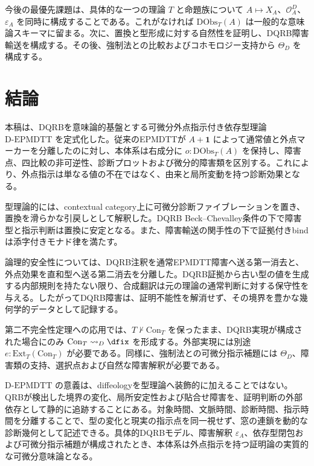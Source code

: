 \documentclass[a4paper,11pt]{ltjsarticle}
\theoremstyle{definition}
\theoremstyle{plain}
\newcommand{\DEPMDTT}{\mathrm{D}\text{-}\mathrm{EPMDTT}}
\newcommand{\DObs}{\mathrm{DObs}}
\newcommand{\Ext}{\mathrm{Ext}}
\newcommand{\Con}{\mathrm{Con}}
\newcommand{\Unit}{\mathbf 1}
\begin{document}
今後の最優先課題は、具体的な一つの理論 $T$ と命題族について $A\mapsto X_A$、$\mathcal O_A^D$、$\varepsilon_A$ を同時に構成することである。これがなければ $\DObs_T(A)$ は一般的な意味論スキーマに留まる。次に、置換と型形成に対する自然性を証明し、DQRB障害輸送を構成する。その後、強制法との比較およびコホモロジー支持から $\Theta_D$ を構成する。

\section{結論}

本稿は、DQRBを意味論的基盤とする可微分外点指示付き依存型理論 $\DEPMDTT$ を定式化した。従来のEPMDTTが $A+\Unit$ によって通常値と外点マーカーを分離したのに対し、本体系は右成分に $o:\DObs_T(A)$ を保持し、障害点、四比較の非可逆性、診断プロットおよび微分的障害類を区別する。これにより、外点指示は単なる値の不在ではなく、由来と局所変動を持つ診断効果となる。

型理論的には、contextual category上に可微分診断ファイブレーションを置き、置換を滑らかな引戻しとして解釈した。DQRB Beck--Chevalley条件の下で障害型と指示判断は置換に安定となる。また、障害輸送の関手性の下で証拠付きbindは添字付きモナド律を満たす。

論理的安全性については、DQRB注釈を通常EPMDTT障害へ送る第一消去と、外点効果を直和型へ送る第二消去を分離した。DQRB証拠から古い型の値を生成する内部規則を持たない限り、合成翻訳は元の理論の通常判断に対する保守性を与える。したがってDQRB障害は、証明不能性を解消せず、その境界を豊かな幾何学的データとして記録する。

第二不完全性定理への応用では、$T\nvdash\Con_T$ を保ったまま、DQRB実現が構成された場合にのみ $\Con_T\rightsquigarrow_D\dfix$ を形成する。外部実現には別途 $e:\Ext_T(\Con_T)$ が必要である。同様に、強制法との可微分指示補題には $\Theta_D$、障害類の支持、選択点および自然な障害解釈が必要である。

$\DEPMDTT$ の意義は、diffeologyを型理論へ装飾的に加えることではない。QRBが検出した境界の変化、局所安定性および貼合せ障害を、証明判断の外部依存として静的に追跡することにある。対象時間、文脈時間、診断時間、指示時間を分離することで、型の変化と現実の指示点を同一視せず、窓の連鎖を動的な診断幾何として記述できる。具体的DQRBモデル、障害解釈 $\varepsilon_A$、依存型閉包および可微分指示補題が構成されたとき、本体系は外点指示を持つ証明論の実質的な可微分意味論となる。



\end{document}
